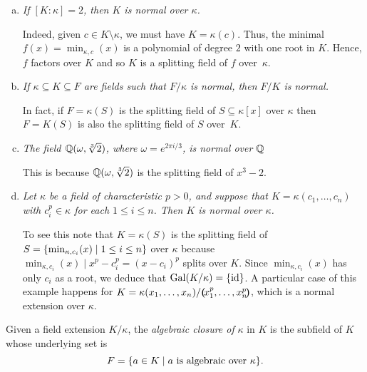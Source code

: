 \begin{xmpls}\label{xmpls:normal}${}$
\begin{enumerate}[a), font=\upshape]\label{xmpl1:normal}
    \item \textit{If\/ $[K:\kappa]=2$, then\/ $K$ is normal over\/ $\kappa$.}
    
    Indeed, given\/ $c\in K\setminus\kappa$, we must have\/ $K=\kappa(c)$. Thus, the minimal\/ $f(x)= \min_{\kappa,c}(x)$ is a polynomial of degree $2$ with one root in\/ $K$. Hence, $f$ factors over\/ $K$ and so\/ $K$ is a splitting field of\/ $f$ over\/~$\kappa$.

    \item \textit{If\/ $\kappa\subseteq K\subseteq F$ are fields such that\/ $F/\kappa$ is normal, then\/ $F/K$ is normal.}
    
    In fact, if $F=\kappa(S)$ is the splitting field of $S\subseteq\kappa[x]$ over $\kappa$ then $F=K(S)$ is also the splitting field of $S$ over~$K$.

    \item \textit{The field\/ $\mathbb{Q}(\omega,\sqrt[3]2)$, where $\omega=e^{2\pi i/3}$, is normal over\/ $\mathbb{Q}$}
    
    This is because $\mathbb{Q}(\omega,\sqrt[3]2)$ is the splitting field of $x^3-2$.

    \item \textit{Let\/ $\kappa$ be a field of characteristic\/ $p>0$, and suppose that\/ $K= \kappa(c_1,\dots,c_n)$ with\/ $c_i^p\in\kappa$ for each\/ $1\le i\le n$. Then\/ $K$ is normal over\/ $\kappa$.}
    
    To see this note that $K=\kappa(S)$ is the splitting field of $S=\{\min_{\kappa,c_i}(x)\mid1\le i\le n\}$ over $\kappa$ because $\min_{\kappa,c_i}(x)\mid x^p-c_i^p=(x-c_i)^p$ splits over $K$. Since $\min_{\kappa,c_i}(x)$ has only $c_i$ as a root, we deduce that $\operatorname{Gal}(K/\kappa)=\{\operatorname{id}\}$. A particular case of this example happens for $K=\kappa(x_1,\dots,x_n)/\textrm{\boldmath$($}\!x_1^p,\dots,x_n^p\!\textrm{\boldmath$)$}$, which is a normal extension over $\kappa$.
\end{enumerate}
\end{xmpls}

\begin{defn}
    Given a field extension $K/\kappa$, the \textsl{algebraic closure of} $\kappa$ in $K$ is the subfield of $K$ whose underlying set is
    $$
        F = \{a\in K \mid a\text{\rm\ is algebraic over }\kappa\}.
    $$
\end{defn}

